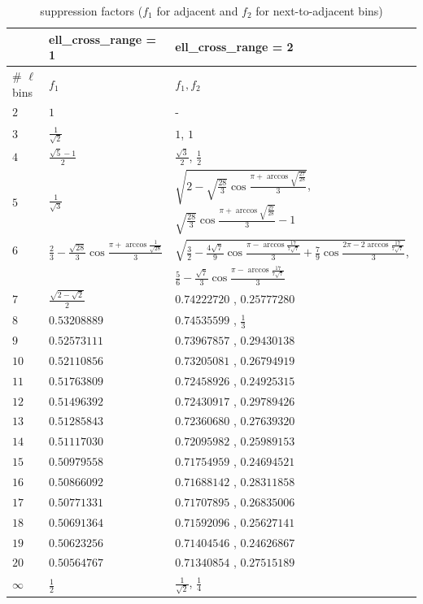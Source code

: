 \documentclass[12pt, a4paper]{ctexart} %
\begin{document}
\begin{table}
  \caption{suppression factors ($f_1$ for adjacent and $f_2$ for next-to-adjacent bins) \label{tab:sup_mat}}
  \begin{tabular}{lll}
    \hline
    \hline
    & ell\_cross\_range = 1 &  ell\_cross\_range = 2  \\
    \hline
    \# $\ell$ bins &  $f_1$ & $f_1, f_2$ \\
    \hline
    $2$ & $1$ &  - \\
    $3$ & $\frac{1}{\sqrt{2}}$ & $1$, $1$ \\
    $4$ & $\frac{\sqrt{5}-1}{2}$ & $\frac{\sqrt{3}}{2}$, $\frac{1}{2}$ \\
    $5$ & $\frac{1}{\sqrt{3}}$ & $\sqrt{2-\sqrt{\frac{28}{3}}\cos\frac{\pi+\arccos\sqrt{\frac{27}{28}}}{3}}$, $\sqrt{\frac{28}{3}}\cos\frac{\pi+\arccos\sqrt{\frac{27}{28}}}{3}-1$ \\
    $6$ & $\frac{2}{3} -\frac{\sqrt{28}}{3}\cos\frac{\pi+\arccos\frac{1}{\sqrt{28}}}{3}$ & $\sqrt{\frac{3}{2}-\frac{4\sqrt{7}}{9}\cos\frac{\pi-\arccos\frac{17}{7\sqrt{7}}}{3} + \frac{7}{9}\cos\frac{2\pi-2\arccos\frac{17}{7\sqrt{7}}}{3}}$, \\ %
    & & $\frac{5}{6} - \frac{\sqrt{7}}{3}\cos\frac{\pi-\arccos\frac{17}{7\sqrt{7}}}{3}$ \\
    $7$ & $\frac{\sqrt{2-\sqrt{2}}}{2}$ & $0.74222720$ ,  $0.25777280$ \\
    $8$  & $0.53208889$ & $0.74535599$ ,  $\frac{1}{3}$ \\
    $9$  & $0.52573111$ & $0.73967857$ ,  $0.29430138$ \\
    $10$ & $0.52110856$ & $0.73205081$ ,  $0.26794919$ \\
    $11$ & $0.51763809$ & $0.72458926$ ,  $0.24925315$ \\
    $12$ & $0.51496392$ & $0.72430917$ ,  $0.29789426$ \\
    $13$ & $0.51285843$ & $0.72360680$ ,  $0.27639320$ \\
    $14$ & $0.51117030$ & $0.72095982$ ,  $0.25989153$ \\
    $15$ & $0.50979558$ & $0.71754959$ ,  $0.24694521$ \\
    $16$ & $0.50866092$ & $0.71688142$ ,  $0.28311858$ \\
    $17$ & $0.50771331$ & $0.71707895$ ,  $0.26835006$ \\
    $18$ & $0.50691364$ & $0.71592096$ ,  $0.25627141$ \\
    $19$ & $0.50623256$ & $0.71404546$ ,  $0.24626867$ \\
    $20$ & $0.50564767$ & $0.71340854$ ,  $0.27515189$ \\
    $\infty$ & $\frac{1}{2}$ & $\frac{1}{\sqrt{2}}$, $\frac{1}{4}$ \\
    \hline
  \end{tabular}
\end{table}
\end{document}

